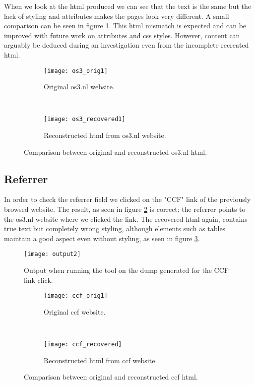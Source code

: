 When we look at the html produced we can see that the text is the same but the lack of styling and attributes makes the pages look very different. A small comparison can be seen in figure \ref{fig:os3_compare}. This html mismatch is expected and can be improved with future work on attributes and css styles. However, content can arguably be deduced during an investigation even from the incomplete recreated html.

\begin{figure}[h]
	\begin{subfigure}{\linewidth}
		\centering
		\texttt{[image: os3\_orig1]}
		\caption{Original os3.nl website.}
	\end{subfigure}\\[1ex]

	\begin{subfigure}{\linewidth}
		\centering
		\texttt{[image: os3\_recovered1]}
		\caption{Reconstructed html from os3.nl website.}
	\end{subfigure}
	\caption{Comparison between original and reconstructed os3.nl html.}
	\label{fig:os3_compare}
\end{figure}

\subsection{Referrer}
In order to check the referrer field we clicked on the "CCF" link of the previously browsed website. The result, as seen in figure \ref{img:output2} is correct: the referrer points to the os3.nl website where we clicked the link. The recovered html again, contains true text but completely wrong styling, although elements such as tables maintain a good aspect even without styling, as seen in figure \ref{fig:ccf_compare}.

\begin{figure}[h]
	\centering
	\texttt{[image: output2]}
	\caption{Output when running the tool on the dump generated for the CCF link click.}
	\label{img:output2}
\end{figure}

\begin{figure}[h]
	\begin{subfigure}{\linewidth}
		\centering
		\texttt{[image: ccf\_orig1]}
		\caption{Original ccf website.}
	\end{subfigure}\\[1ex]

	\begin{subfigure}{\linewidth}
		\centering
		\texttt{[image: ccf\_recovered]}
		\caption{Reconstructed html from ccf website.}
	\end{subfigure}
	\caption{Comparison between original and reconstructed ccf html.}
	\label{fig:ccf_compare}
\end{figure}

